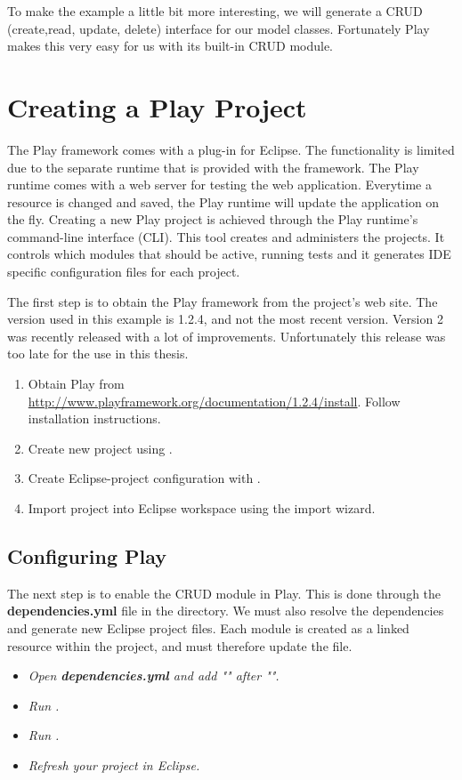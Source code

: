 To make the example a little bit more interesting, we will generate a CRUD (create,read, update, delete) interface for our model classes. Fortunately Play makes this very easy for us with its built-in CRUD module.

\section{Creating a Play Project}
The Play framework comes with a plug-in for Eclipse. The functionality is limited due to the separate runtime that is provided with the framework. The Play runtime comes with a web server for testing the web application. Everytime a resource is changed and saved, the Play runtime will update the application on the fly. Creating a new Play project is achieved through the Play runtime's command-line interface (CLI). This tool creates and administers the projects. It controls which modules that should be active, running tests and it generates IDE specific configuration files for each project.

The first step is to obtain the Play framework from the project's web site. The version used in this example is 1.2.4, and not the most recent version. Version 2 was recently released with a lot of improvements. Unfortunately this release was too late for the use in this thesis.

\begin{enumerate}
  \item Obtain Play from \url{http://www.playframework.org/documentation/1.2.4/install}. Follow installation instructions.
  \item Create new project using .
  \item Create Eclipse-project configuration with .
  \item Import project into Eclipse workspace using the import wizard.
\end{enumerate}

\subsection{Configuring Play}
The next step is to enable the CRUD module in Play. This is done through the \textbf{dependencies.yml} file in the  directory. We must also resolve the dependencies and generate new Eclipse project files. Each module is created as a linked resource within the project, and must therefore update the  file.
\begin{itemize}
  \item \emph{Open \textbf{dependencies.yml} and add "" after "".}
  \item \emph{Run .}
  \item \emph{Run .}
  \item \emph{Refresh your project in Eclipse.}
\end{itemize}

